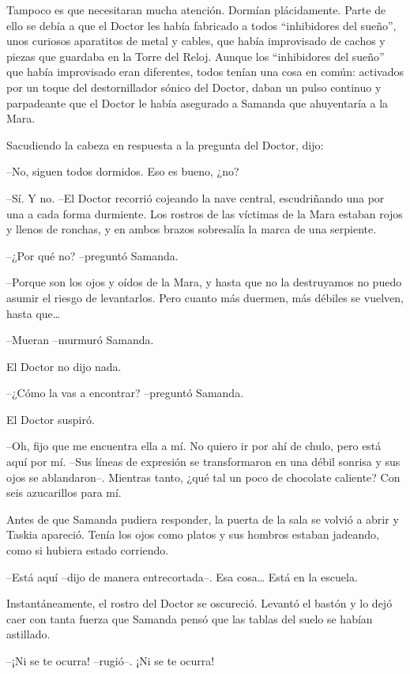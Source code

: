 Tampoco es que necesitaran mucha atención. Dormían plácidamente. Parte de ello se debía a que el Doctor les había fabricado a todos “inhibidores del sueño”, unos curiosos aparatitos de metal y cables, que había improvisado de cachos y piezas que guardaba en la Torre del Reloj. Aunque los “inhibidores del sueño” que había improvisado eran diferentes, todos tenían una cosa en común: activados por un toque del destornillador sónico del Doctor, daban un pulso continuo y parpadeante que el Doctor le había asegurado a Samanda que ahuyentaría a la Mara.

Sacudiendo la cabeza en respuesta a la pregunta del Doctor, dijo:

--No, siguen todos dormidos. Eso es bueno, ¿no?

--Sí. Y no. --El Doctor recorrió cojeando la nave central, escudriñando una por una a cada forma durmiente. Los rostros de las víctimas de la Mara estaban rojos y llenos de ronchas, y en ambos brazos sobresalía la marca de una serpiente.

--¿Por qué no? --preguntó Samanda.

--Porque son los ojos y oídos de la Mara, y hasta que no la destruyamos no puedo asumir el riesgo de levantarlos. Pero cuanto más duermen, más débiles se vuelven, hasta que…

--Mueran --murmuró Samanda.

El Doctor no dijo nada.

--¿Cómo la vas a encontrar? --preguntó Samanda.

El Doctor suspiró.

--Oh, fijo que me encuentra ella a mí. No quiero ir por ahí de chulo, pero está aquí por mí. --Sus líneas de expresión se transformaron en una débil sonrisa y sus ojos se ablandaron--. Mientras tanto, ¿qué tal un poco de chocolate caliente? Con seis azucarillos para mí.

Antes de que Samanda pudiera responder, la puerta de la sala se volvió a abrir y Taskia apareció. Tenía los ojos como platos y sus hombros estaban jadeando, como si hubiera estado corriendo.

--Está aquí --dijo de manera entrecortada--. Esa cosa… Está en la escuela.

Instantáneamente, el rostro del Doctor se oscureció. Levantó el bastón y lo dejó caer con tanta fuerza que Samanda pensó que las tablas del suelo se habían astillado.

--¡Ni se te ocurra! --rugió--. ¡Ni se te ocurra!



